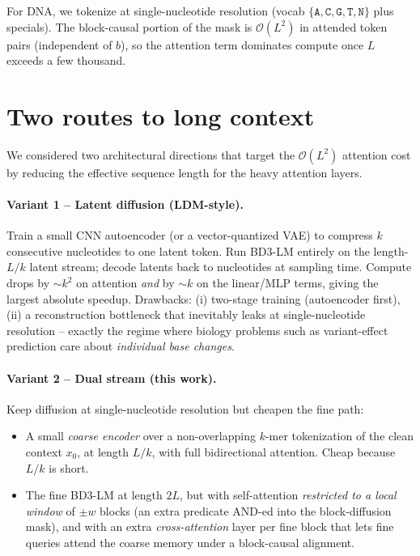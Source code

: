 \documentclass[11pt,a4paper]{article}
\begin{document}
For DNA, we tokenize at single-nucleotide resolution (vocab
\(\{\texttt{A},\texttt{C},\texttt{G},\texttt{T},\texttt{N}\}\) plus
specials). The block-causal portion of the mask is
\(\mathcal{O}(L^2)\) in attended token pairs (independent of \(b\)), so the
attention term dominates compute once \(L\) exceeds a few thousand.

\section{Two routes to long context}

We considered two architectural directions that target the
\(\mathcal{O}(L^2)\) attention cost by reducing the effective sequence length
for the heavy attention layers.

\paragraph{Variant 1 -- Latent diffusion (LDM-style).}
Train a small CNN autoencoder (or a vector-quantized VAE) to compress
\(k\) consecutive nucleotides to one latent token. Run BD3-LM entirely on the
length-\(L/k\) latent stream; decode latents back to nucleotides at sampling
time. Compute drops by \(\sim k^2\) on attention \emph{and} by \(\sim k\) on
the linear/MLP terms, giving the largest absolute speedup. Drawbacks:
(i) two-stage training (autoencoder first), (ii) a reconstruction bottleneck
that inevitably leaks at single-nucleotide resolution -- exactly the regime
where biology problems such as variant-effect prediction care about
\emph{individual base changes}.

\paragraph{Variant 2 -- Dual stream (this work).}
Keep diffusion at single-nucleotide resolution but cheapen the fine path:
\begin{itemize}
  \item A small \emph{coarse encoder} over a non-overlapping \(k\)-mer
        tokenization of the clean context \(x_0\), at length \(L/k\), with
        full bidirectional attention. Cheap because \(L/k\) is short.
  \item The fine BD3-LM at length \(2L\), but with self-attention
        \emph{restricted to a local window} of \(\pm w\) blocks (an extra
        predicate AND-ed into the block-diffusion mask), and with an extra
        \emph{cross-attention} layer per fine block that lets fine queries
        attend the coarse memory under a block-causal alignment.
\end{itemize}
\end{document}
